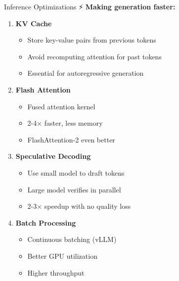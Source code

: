 \documentclass[aspectratio=169]{beamer}
\begin{document}
\begin{frame}[shrink=10]{Inference Optimizations ⚡}
\textbf{Making generation faster:}

\vspace{0.5em}

\begin{enumerate}\setlength{\itemsep}{0pt}
    \item \textbf{KV Cache}
    \begin{itemize}\setlength{\itemsep}{0pt}
        \item Store key-value pairs from previous tokens
        \item Avoid recomputing attention for past tokens
        \item Essential for autoregressive generation
    \end{itemize}

    \item \textbf{Flash Attention}
    \begin{itemize}\setlength{\itemsep}{0pt}
        \item Fused attention kernel
        \item 2-4× faster, less memory
        \item FlashAttention-2 even better
    \end{itemize}

    \item \textbf{Speculative Decoding}
    \begin{itemize}\setlength{\itemsep}{0pt}
        \item Use small model to draft tokens
        \item Large model verifies in parallel
        \item 2-3× speedup with no quality loss
    \end{itemize}

    \item \textbf{Batch Processing}
    \begin{itemize}\setlength{\itemsep}{0pt}
        \item Continuous batching (vLLM)
        \item Better GPU utilization
        \item Higher throughput
    \end{itemize}
\end{enumerate}
\end{frame}
\end{document}
